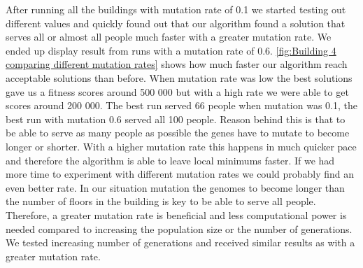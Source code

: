 After running all the buildings with mutation rate of 0.1 we started testing out different values and quickly found out that our algorithm found a solution that serves all or almost all people much faster with a greater mutation rate. We ended up display result from runs with a mutation rate of 0.6. \ref{fig:Building 4 comparing different mutation rates} shows how much faster our algorithm reach acceptable solutions than before. When mutation rate was low the best solutions gave us a fitness scores around 500 000 but with a high rate we were able to get scores around 200 000. The best run served 66 people when mutation was 0.1, the best run with mutation 0.6 served all 100 people. Reason behind this is that to be able to serve as many people as possible the genes have to mutate to become longer or shorter. With a higher mutation rate this happens in much quicker pace and therefore the algorithm is able to leave local minimums faster. If we had more time to experiment with different mutation rates we could probably find an even better rate. In our situation mutation the genomes to become longer than the number of floors in the building is key to be able to serve all people. Therefore, a greater mutation rate is beneficial and less computational power is needed compared to increasing the population size or the number of generations. We tested increasing number of generations and received similar results as with a greater mutation rate.

